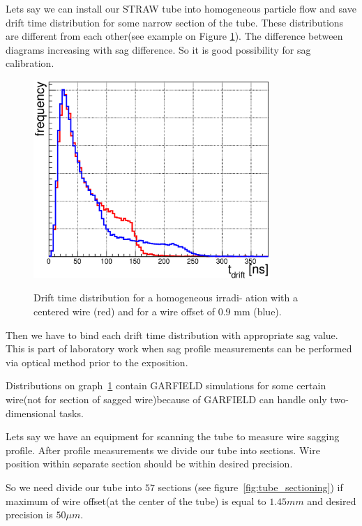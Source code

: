 \documentclass[]{article}
\begin{document}
	Lets say we can install our STRAW tube into homogeneous particle flow and save drift time distribution for some narrow section of the tube. These distributions are different from each other(see example on Figure \ref{fig:DrftTimeDistr_00_09_comp}). The difference between diagrams increasing with sag difference. So it is good possibility for sag calibration.
		
	\begin{figure}[h!]
	\centering
	\includegraphics[width=0.8\textwidth]{00_09_driftTimeDistr}
	\label{fig:DrftTimeDistr_00_09_comp}
	\caption{Drift time distribution for a homogeneous irradi-
ation with a centered wire (red) and for a wire offset of 0.9 mm (blue).}
	\end{figure}
	
	Then we have to bind each drift time distribution with appropriate sag value. This is part of laboratory work when sag profile measurements can be performed via optical method prior to the exposition.
	
	Distributions on graph~\ref{fig:DrftTimeDistr_00_09_comp} contain GARFIELD simulations for some certain wire(not for section of sagged wire)because of GARFIELD can handle only two-dimensional tasks.
	
	Lets say we have an equipment for scanning the tube to measure wire sagging profile. After profile measurements we divide our tube into sections. Wire position within separate section should be within desired precision.
	
	So we need divide our tube into $57$ sections (see figure~\ref{fig:tube_sectioning}) if maximum of wire offset(at the center of the tube) is equal to $1.45mm$ and desired precision is $50\mu m$.
	
\end{document}
